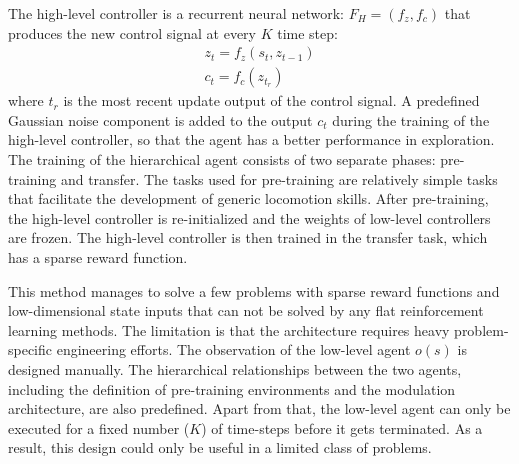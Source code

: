The high-level controller is a recurrent neural network: $F_H = (f_z,f_c)$ that produces the new control signal at every $K$ time step:
\begin{align}
z_t = f_z(s_t,z_{t-1}) \\
c_t = f_c(z_{t_r})
\end{align}
where $t_r$ is the most recent update output of the control signal. A predefined Gaussian noise component is added to the output $c_t$ during the training of the high-level controller, so that the agent has a better performance in exploration.
The training of the hierarchical agent consists of two separate phases: pre-training and transfer. The tasks used for pre-training are relatively simple tasks that facilitate the development of generic locomotion skills. After pre-training, the high-level controller is re-initialized and the weights of low-level controllers are frozen. The high-level controller is then trained in the transfer task, which has a sparse reward function.

This method manages to solve a few problems with sparse reward functions and low-dimensional state inputs that can not be solved by any flat reinforcement learning methods. The limitation is that the architecture requires heavy problem-specific engineering efforts. The observation of the low-level agent $o(s)$ is designed manually. The hierarchical relationships between the two agents, including the definition of pre-training environments and the modulation architecture, are also predefined. Apart from that, the low-level agent can only be executed for a fixed number ($K$) of time-steps before it gets terminated. As a result, this design could only be useful in a limited class of problems.

